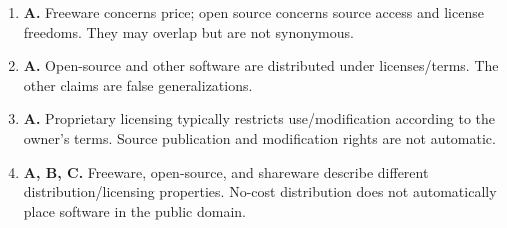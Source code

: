 \begin{enumerate}[label=\textbf{Q\arabic*.}, leftmargin=*]
\item \textbf{A.} Freeware concerns price; open source concerns source access and license freedoms. They may overlap but are not synonymous.

\item \textbf{A.} Open-source and other software are distributed under licenses/terms. The other claims are false generalizations.

\item \textbf{A.} Proprietary licensing typically restricts use/modification according to the owner's terms. Source publication and modification rights are not automatic.

\item \textbf{A, B, C.} Freeware, open-source, and shareware describe different distribution/licensing properties. No-cost distribution does not automatically place software in the public domain.

\end{enumerate}
